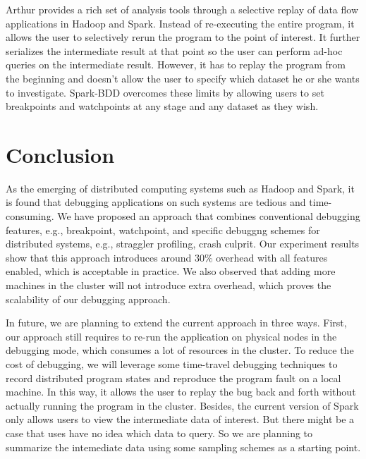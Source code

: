 \documentclass{acm_proc_article-sp}
\begin{document}
Arthur provides a rich set of analysis tools through a selective replay of data flow applications in Hadoop and Spark. Instead of re-executing the entire program, it allows the user to selectively rerun the program to the point of interest. It further serializes the intermediate result at that point so the user can perform ad-hoc queries on the intermediate result. However, it has to replay the program from the beginning and doesn't allow the user to specify which dataset he or she wants to investigate. Spark-BDD overcomes these limits by allowing users to set breakpoints and watchpoints at any stage and any dataset as they wish.

\section{Conclusion}
As the emerging of distributed computing systems such as Hadoop and Spark, it is found that debugging applications on such systems are tedious and time-consuming. We have proposed an approach that combines conventional debugging features, e.g., breakpoint, watchpoint, and specific debuggng schemes for distributed systems, e.g., straggler profiling, crash culprit. Our experiment results show that this approach introduces around 30\% overhead with all features enabled, which is acceptable in practice. We also observed that adding more machines in the cluster will not introduce extra overhead, which proves the scalability of our debugging approach.

In future, we are planning to extend the current approach in three ways. First, our approach still requires to re-run the application on physical nodes in the debugging mode, which consumes a lot of resources in the cluster. To reduce the cost of debugging, we will leverage some time-travel debugging techniques to record distributed program states and reproduce the program fault on a local machine. In this way, it allows the user to replay the bug back and forth without actually running the program in the cluster. Besides, the current version of Spark only allows users to view the intermediate data of interest. But there might be a case that uses have no idea which data to query. So we are planning to summarize the intemediate data using some sampling schemes as a starting point.


  
\balancecolumns
\end{document}
